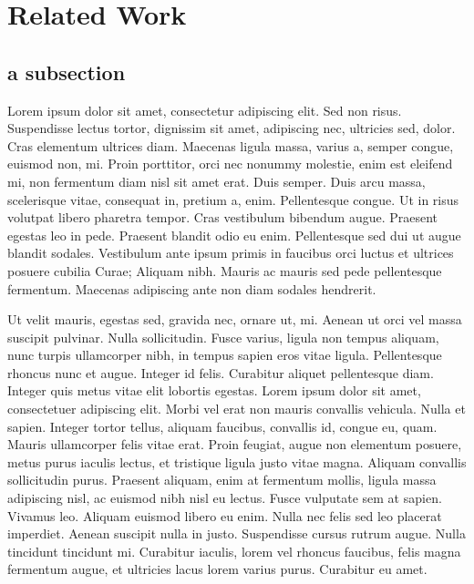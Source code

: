 \section{Related Work}
\subsection{a subsection}

Lorem ipsum dolor sit amet, consectetur adipiscing elit. Sed non risus. Suspendisse lectus tortor, dignissim sit amet, adipiscing nec, ultricies sed, dolor. Cras elementum ultrices diam. Maecenas ligula massa, varius a, semper congue, euismod non, mi. Proin porttitor, orci nec nonummy molestie, enim est eleifend mi, non fermentum diam nisl sit amet erat. Duis semper. Duis arcu massa, scelerisque vitae, consequat in, pretium a, enim. Pellentesque congue. Ut in risus volutpat libero pharetra tempor. Cras vestibulum bibendum augue. Praesent egestas leo in pede. Praesent blandit odio eu enim. Pellentesque sed dui ut augue blandit sodales. Vestibulum ante ipsum primis in faucibus orci luctus et ultrices posuere cubilia Curae; Aliquam nibh. Mauris ac mauris sed pede pellentesque fermentum. Maecenas adipiscing ante non diam sodales hendrerit.

Ut velit mauris, egestas sed, gravida nec, ornare ut, mi. Aenean ut orci vel massa suscipit pulvinar. Nulla sollicitudin. Fusce varius, ligula non tempus aliquam, nunc turpis ullamcorper nibh, in tempus sapien eros vitae ligula. Pellentesque rhoncus nunc et augue. Integer id felis. Curabitur aliquet pellentesque diam. Integer quis metus vitae elit lobortis egestas. Lorem ipsum dolor sit amet, consectetuer adipiscing elit. Morbi vel erat non mauris convallis vehicula. Nulla et sapien. Integer tortor tellus, aliquam faucibus, convallis id, congue eu, quam. Mauris ullamcorper felis vitae erat. Proin feugiat, augue non elementum posuere, metus purus iaculis lectus, et tristique ligula justo vitae magna.
Aliquam convallis sollicitudin purus. Praesent aliquam, enim at fermentum mollis, ligula massa adipiscing nisl, ac euismod nibh nisl eu lectus. Fusce vulputate sem at sapien. Vivamus leo. Aliquam euismod libero eu enim. Nulla nec felis sed leo placerat imperdiet. Aenean suscipit nulla in justo. Suspendisse cursus rutrum augue. Nulla tincidunt tincidunt mi. Curabitur iaculis, lorem vel rhoncus faucibus, felis magna fermentum augue, et ultricies lacus lorem varius purus. Curabitur eu amet.

